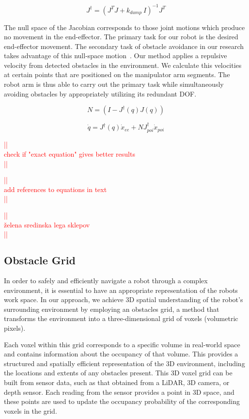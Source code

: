 \documentclass[a4paper]{article}
\newcommand\todocomment[1]{\textcolor{red}{||\\ #1\\||}}
\begin{document}
\begin{equation}   	
	J^{\dagger} = (J^{T}J + k_{damp} ~I)^{-1}J^{T}
	\label{eq:moore_penrose}
\end{equation}
    
The null space of the Jacobian corresponds to those joint motions which produce no movement in the end-effector. The primary task for our robot is the desired end-effector movement. The secondary task of obstacle avoidance in our research takes advantage of this null-space motion~\cite{lajpah_Petri_2012}. Our method applies a repulsive velocity from detected obstacles in the environment. We calculate this velocities at certain points that are positioned on the manipulator arm segments. The robot arm is thus able to carry out the primary task while simultaneously avoiding obstacles by appropriately utilizing its redundant DOF.

\begin{equation}
	N = (I - J^{\dagger}(q)J(q))
	\label{eq:Null-Space}
\end{equation}

\begin{equation}
	\dot{q} = J^{\dagger}(q) \dot{x}_{ee} + N J^{\dagger}_{poi} \dot{x}_{poi}
	\label{eq:manipulator_kinematics}
\end{equation}

\todocomment{check if "exact equation" gives better results}


\todocomment{add references to equations in text}

\todocomment{želena sredinska lega sklepov}


\subsection{Obstacle Grid}

In order to safely and efficiently navigate a robot through a complex environment, it is essential to have an appropriate representation of the robots work space. In our approach, we achieve 3D spatial understanding of the robot's surrounding environment by employing an obstacles grid, a method that transforms the environment into a three-dimensional grid of voxels (volumetric pixels).

Each voxel within this grid corresponds to a specific volume in real-world space and contains information about the occupancy of that volume. This provides a structured and spatially efficient representation of the 3D environment, including the locations and extents of any obstacles present. This 3D voxel grid can be built from sensor data, such as that obtained from a LiDAR, 3D camera, or depth sensor. Each reading from the sensor provides a point in 3D space, and these points are used to update the occupancy probability of the corresponding voxels in the grid.
\end{document}
